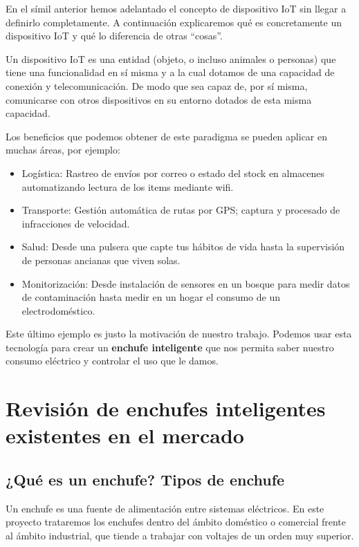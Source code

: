 \documentclass[a4paper,10pt]{article}
\begin{document}
En el símil anterior hemos adelantado el concepto de dispositivo IoT sin
llegar a definirlo completamente. A continuación explicaremos qué es
concretamente un dispositivo IoT y qué lo diferencia de otras ``cosas''.

Un dispositivo IoT es una entidad (objeto, o incluso animales o
personas) que tiene una funcionalidad en sí misma y a la cual dotamos de
una capacidad de conexión y telecomunicación. De modo que sea capaz de,
por sí misma, comunicarse con otros dispositivos en su entorno dotados
de esta misma capacidad.

Los beneficios que podemos obtener de este paradigma se pueden aplicar
en muchas áreas\cite{vongsingthongs.;smanchats.IoTExamplesSuranaree},
por ejemplo:

\begin{itemize}
\item
  Logística: Rastreo de envíos por correo o estado del stock en
  almacenes automatizando lectura de los items mediante wifi.
\item
  Transporte: Gestión automática de rutas por GPS; captura y procesado
  de infracciones de velocidad.
\item
  Salud: Desde una pulsera que capte tus hábitos de vida hasta
  la supervisión de personas ancianas que viven solas.
\item
  Monitorización: Desde instalación de sensores en un bosque para medir
  datos de contaminación hasta medir en un hogar el consumo de un
  electrodoméstico.
\end{itemize}

Este último ejemplo es justo la motivación de nuestro trabajo. Podemos
usar esta tecnología para crear un \textbf{enchufe inteligente} que
nos permita saber nuestro consumo eléctrico y controlar el uso que le
damos.

\newpage

\section{Revisión de enchufes inteligentes existentes en el
mercado}\label{revisiuxf3n-de-enchufes-inteligentes-existentes-en-el-mercado}

\subsection{¿Qué es un enchufe? Tipos de
enchufe}\label{quuxe9-es-un-enchufe-tipos-de-enchufe}

Un enchufe es una fuente de alimentación entre sistemas eléctricos. En
este proyecto trataremos los enchufes dentro del ámbito doméstico o
comercial frente al ámbito industrial, que tiende a trabajar con
voltajes de un orden muy superior.
\end{document}
